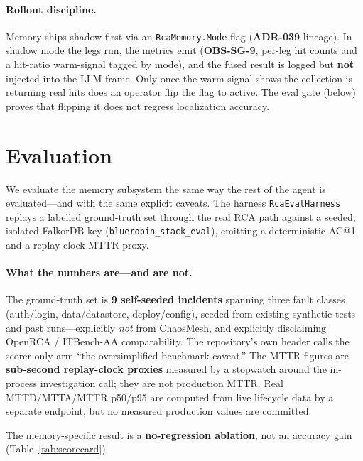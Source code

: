 \documentclass[11pt]{article}
\begin{document}
\paragraph{Rollout discipline.}
Memory ships shadow-first via an \texttt{RcaMemory.Mode} flag (\textbf{ADR-039}
lineage). In shadow mode the legs run, the metrics emit (\textbf{OBS-SG-9}, per-leg
hit counts and a hit-ratio warm-signal tagged by mode), and the fused result is
logged but \textbf{not} injected into the LLM frame. Only once the warm-signal
shows the collection is returning real hits does an operator flip the flag to
active. The eval gate (below) proves that flipping it does not regress
localization accuracy.

\section{Evaluation}
\label{sec:eval}

We evaluate the memory subsystem the same way the rest of the agent is
evaluated---and with the same explicit caveats. The harness \texttt{RcaEvalHarness}
replays a labelled ground-truth set through the real RCA path against a seeded,
isolated FalkorDB key (\texttt{bluerobin\_stack\_eval}), emitting a deterministic
AC@1 and a replay-clock MTTR proxy.

\paragraph{What the numbers are---and are not.}
The ground-truth set is \textbf{9 self-seeded incidents} spanning three fault
classes (auth/login, data/datastore, deploy/config), seeded from existing
synthetic tests and past runs---explicitly \emph{not} from ChaosMesh, and
explicitly disclaiming OpenRCA / ITBench-AA comparability. The repository's own
header calls the scorer-only arm ``the oversimplified-benchmark caveat.'' The MTTR
figures are \textbf{sub-second replay-clock proxies} measured by a stopwatch
around the in-process investigation call; they are not production MTTR. Real
MTTD/MTTA/MTTR p50/p95 are computed from live lifecycle data by a separate
endpoint, but no measured production values are committed.

The memory-specific result is a \textbf{no-regression ablation}, not an accuracy
gain (Table~\ref{tab:scorecard}).
\end{document}
